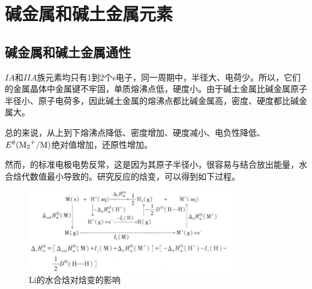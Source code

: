 \documentclass[a4paper,UTF8]{article}
\begin{document}
\section{碱金属和碱土金属元素}

\subsection{碱金属和碱土金属通性}

$IA$和$IIA$族元素均只有1到2个s电子，同一周期中，半径大、电荷少。所以，它们的金属晶体中金属键不牢固，单质熔沸点低，硬度小。由于碱土金属比碱金属原子半径小、原子电荷多，因此碱土金属的熔沸点都比碱金属高，密度、硬度都比碱金属大。

总的来说，从上到下熔沸点降低、密度增加、硬度减小、电负性降低、$E^{\theta}(\ce{M2+}/\ce{M})$绝对值增加，还原性增加。

然而，的标准电极电势反常，这是因为其原子半径小，很容易与结合放出能量，水合焓代数值最小导致的。研究反应的焓变，可以得到如下过程。

\begin{figure}[htpb]
	\centering
	\includegraphics[width=0.8\textwidth]{figure//Li的电极电势反常的原因.png}
	\caption{Li的水合焓对焓变的影响}
	\label{fig:}
\end{figure}
\end{document}
